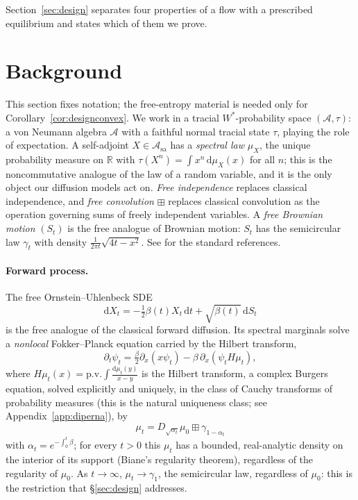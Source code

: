 \documentclass[11pt]{article}
\newcommand{\A}{\mathcal{A}}
\newcommand{\Asa}{\mathcal{A}_{\mathrm{sa}}}
\newcommand{\R}{\mathbb{R}}
\newcommand{\dd}{\mathrm{d}}
\newcommand{\pv}{\mathrm{p.v.}\!}
\theoremstyle{plain}
\theoremstyle{definition}
\theoremstyle{remark}
\begin{document}
Section~\ref{sec:design} separates four properties of a flow with a prescribed equilibrium and
states which of them we prove.

\section{Background}\label{sec:background}

This section fixes notation; the free-entropy material is needed only for
Corollary~\ref{cor:designconvex}. We work in a tracial
$W^*$-probability space $(\A,\tau)$: a von Neumann algebra $\A$
with a faithful normal tracial state $\tau$, playing the role of expectation. A
self-adjoint $X\in\Asa$ has a \emph{spectral law} $\mu_X$, the unique probability
measure on $\R$ with $\tau(X^n)=\int x^n\,\dd\mu_X(x)$ for all $n$; this is the
noncommutative analogue of the law of a random variable, and it is the only object
our diffusion models act on. \emph{Free independence} replaces classical
independence, and \emph{free convolution} $\boxplus$ replaces classical convolution
as the operation governing sums of freely independent variables. A \emph{free
Brownian motion} $(S_t)$ is the free analogue of Brownian motion: $S_t$ has the
semicircular law $\gamma_t$ with density $\tfrac{1}{2\pi t}\sqrt{4t-x^2}$. See
\citet{VDN1992, NicaSpeicher2006} for the standard references.

\paragraph{Forward process.} The free Ornstein--Uhlenbeck SDE
\begin{equation}\label{eq:ffwd}
  \dd X_t = -\tfrac12\beta(t)X_t\,\dd t + \sqrt{\beta(t)}\,\dd S_t
\end{equation}
is the free analogue of the classical forward diffusion. Its spectral marginals solve
a \emph{nonlocal} Fokker--Planck equation carried by the Hilbert transform,
\begin{equation}\label{eq:ffp}
  \partial_t\psi_t = \tfrac{\beta}{2}\partial_x(x\psi_t) - \beta\,\partial_x(\psi_t
  H\mu_t),
\end{equation}
where $H\mu_t(x)=\pv\!\int\frac{\dd\mu_t(y)}{x-y}$ is the Hilbert transform,
a complex Burgers equation, solved explicitly and uniquely, in the class of Cauchy
transforms of probability measures (this is the natural uniqueness class; see Appendix~\ref{app:diperna}), by
\begin{equation}
\mu_t=D_{\sqrt{\alpha_t}}\mu_0\boxplus\gamma_{1-\alpha_t}
\end{equation}
with $\alpha_t=e^{-\int_0^t\beta}$; for every $t>0$ this $\mu_t$ has a bounded,
real-analytic density on the interior of its support (Biane's regularity theorem),
regardless of the regularity of $\mu_0$. As $t\to\infty$,
$\mu_t\to\gamma_1$, the semicircular law, regardless of $\mu_0$: this is the
restriction that \S\ref{sec:design} addresses.
\end{document}
